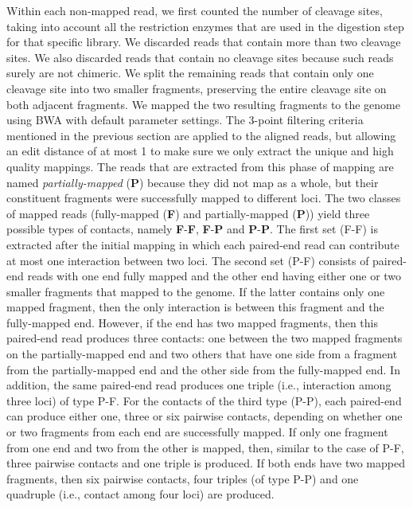 Within each non-mapped read, we first counted the number of cleavage sites,
taking into account all the restriction enzymes that are used in the digestion
step for that specific library. We discarded
reads that contain more than two cleavage sites.
We also discarded reads that contain no cleavage sites because such reads
surely are not chimeric. We split the remaining reads that contain only one
cleavage site into two smaller fragments, preserving the entire cleavage
site on both adjacent fragments.
We mapped the two resulting fragments to the genome
using BWA with default parameter settings. The 3-point filtering criteria
mentioned in the previous section are applied to the aligned reads, but
allowing an edit distance of at most 1 to make sure we only extract the unique
and high quality mappings. The reads that are extracted from this phase of
mapping are named \emph{partially-mapped }(\textbf{P}) because they did not map
as a whole, but their constituent fragments were successfully mapped to
different loci. The two classes of
mapped reads (fully-mapped (\textbf{F}) and partially-mapped (\textbf{P}))
yield three possible types of contacts, namely \textbf{F}-\textbf{F},
\textbf{F}-\textbf{P} and \textbf{P}-\textbf{P}. The first set (F-F) is
extracted after the initial mapping in which each paired-end read can
contribute at most one interaction between two loci.
The second set (P-F) consists of paired-end reads with one end fully mapped and
the other end having either one or two smaller fragments that mapped to the
genome. If the latter contains only one mapped fragment, then the only
interaction is between this fragment and the fully-mapped end. However, if the
end has two mapped fragments, then this paired-end read produces three
contacts: one between the two mapped fragments on the partially-mapped end and
two others that have one side from a fragment from the partially-mapped end and
the other side from the fully-mapped end. In addition, the same paired-end read
produces one triple (i.e., interaction among three loci) of type P-F.
For the contacts of the third type (P-P), each paired-end can produce either
one, three or six pairwise contacts, depending on whether one or two fragments
from each end are successfully mapped. If only one fragment from one end and
two from the other is mapped, then, similar to the case of P-F, three pairwise
contacts and one triple is produced.
If both ends have two mapped fragments, then six pairwise contacts, four triples
(of type P-P) and one quadruple (i.e., contact among four loci) are produced.

